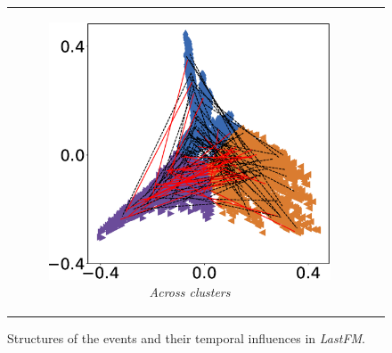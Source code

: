 \begin{figure}
\begin{tabular}[c]{cc}
\begin{subfigure}[t]{0.23\textwidth}
			\includegraphics[width=\textwidth]{./figs/lastfm_s3_cross.eps}
			\caption{\textit{Across clusters}}
		\end{subfigure}
	\end{tabular}
\vspace{-0.15in}
	\caption{\small Structures of the events and their temporal influences in \textit{LastFM}.} \label{fig:lastfm} 
	\vspace{-0.3in} 
\end{figure}
\vspace{-0.1in}
